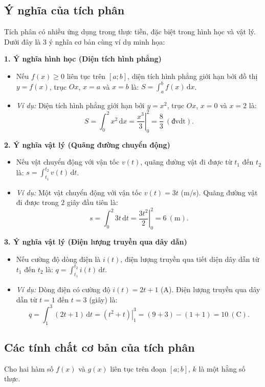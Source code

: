 \documentclass[12pt]{article}
\begin{document}
	\subsection{Ý nghĩa của tích phân}
	
	Tích phân có nhiều ứng dụng trong thực tiễn, đặc biệt trong hình học và vật lý. Dưới đây là 3 ý nghĩa cơ bản cùng ví dụ minh họa:
	
	\noindent \textbf{1. Ý nghĩa hình học (Diện tích hình phẳng)}
	\begin{itemize}
		\item Nếu $f(x) \ge 0$ liên tục trên $[a; b]$, diện tích hình phẳng giới hạn bởi đồ thị $y=f(x)$, trục $Ox$, $x=a$ và $x=b$ là: $S = \displaystyle \int_a^b f(x)\,\mathrm{d}x$.
		\item \textit{Ví dụ:} Diện tích hình phẳng giới hạn bởi $y = x^2$, trục $Ox$, $x = 0$ và $x = 2$ là:
		\[ S = \int_0^2 x^2\,\mathrm{d}x = \left. \frac{x^3}{3} \right|_0^2 = \frac{8}{3} \ (\text{đvdt}). \]
	\end{itemize}
	
	\noindent \textbf{2. Ý nghĩa vật lý (Quãng đường chuyển động)}
	\begin{itemize}
		\item Nếu vật chuyển động với vận tốc $v(t)$, quãng đường vật đi được từ $t_1$ đến $t_2$ là: $s = \displaystyle \int_{t_1}^{t_2} v(t)\,\mathrm{d}t$.
		\item \textit{Ví dụ:} Một vật chuyển động với vận tốc $v(t) = 3t$ (m/s). Quãng đường vật đi được trong $2$ giây đầu tiên là:
		\[ s = \int_0^2 3t\,\mathrm{d}t = \left. \frac{3t^2}{2} \right|_0^2 = 6 \ (\text{m}). \]
	\end{itemize}
	
	\noindent \textbf{3. Ý nghĩa vật lý (Điện lượng truyền qua dây dẫn)}
	\begin{itemize}
		\item Nếu cường độ dòng điện là $i(t)$, điện lượng truyền qua tiết diện dây dẫn từ $t_1$ đến $t_2$ là: $q = \displaystyle \int_{t_1}^{t_2} i(t)\,\mathrm{d}t$.
		\item \textit{Ví dụ:} Dòng điện có cường độ $i(t) = 2t + 1$ (A). Điện lượng truyền qua dây dẫn từ $t=1$ đến $t=3$ (giây) là:
		\[ q = \int_1^3 (2t + 1)\,\mathrm{d}t = \left. (t^2 + t) \right|_1^3 = (9+3) - (1+1) = 10 \ (\text{C}). \]
	\end{itemize}
	
	\subsection{Các tính chất cơ bản của tích phân}
	Cho hai hàm số $f(x)$ và $g(x)$ liên tục trên đoạn $[a; b]$, $k$ là một hằng số thực.
	
\end{document}
